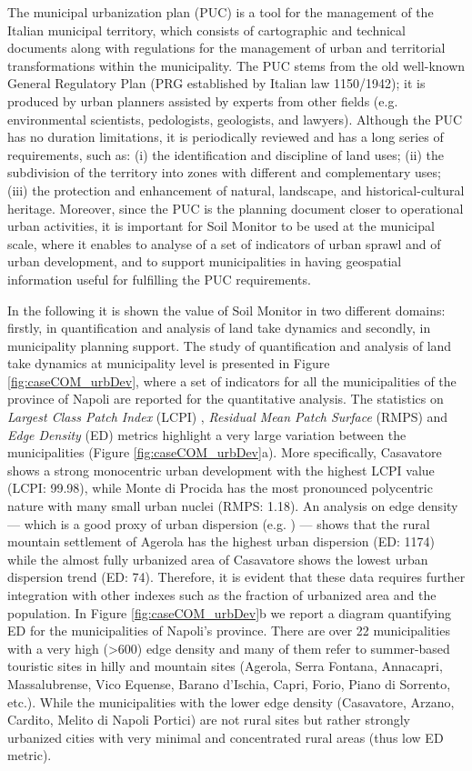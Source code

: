 \documentclass[APA,LATO1COL,doublespace]{WileyNJD-v2}
\begin{document}
The municipal urbanization plan (PUC) is a tool for the management of the Italian municipal territory, which consists of cartographic and technical documents along with regulations for the management of urban and territorial transformations within the municipality.
The PUC stems from the old well-known General Regulatory Plan (PRG established by Italian law 1150/1942); it is produced by urban planners assisted by experts from other fields (e.g. environmental scientists, pedologists, geologists, and lawyers).
Although the PUC has no duration limitations, it is periodically reviewed and has a long series of requirements, such as: (i) the identification and discipline of land uses; (ii) the subdivision of the territory into zones with different and complementary uses; (iii) the protection and enhancement of natural, landscape, and historical-cultural heritage. 
Moreover, since the PUC is the planning document closer to operational urban activities, it is important for Soil Monitor to be used at the municipal scale, where it enables to analyse of a set of indicators of urban sprawl and of urban development, and to support municipalities in having geospatial information useful for fulfilling the PUC requirements.

In the following it is shown the value of Soil Monitor in two different domains: firstly, in quantification and analysis of land take dynamics and secondly, in municipality planning support. 
The study of quantification and analysis of land take dynamics at municipality level is presented in Figure \ref{fig:caseCOM_urbDev}, where a set of indicators for all the municipalities of the province of Napoli are reported for the quantitative analysis.
The statistics on \textit{Largest Class Patch Index} (LCPI) , \textit{Residual Mean Patch Surface} (RMPS) and \textit{Edge Density} (ED) metrics highlight a very large variation between the municipalities (Figure \ref{fig:caseCOM_urbDev}a).
More specifically, Casavatore shows a strong monocentric urban development with the highest LCPI value (LCPI: 99.98), while Monte di Procida has the most pronounced
polycentric nature with many small urban nuclei (RMPS: 1.18).
An analysis on edge density --- which is a good proxy of urban dispersion (e.g. \citealp{SCHWARZ2010}) --- shows that the rural mountain settlement of Agerola has the highest urban dispersion (ED: 1174) while the almost fully urbanized area of Casavatore shows the lowest urban dispersion trend (ED: 74).
Therefore, it is evident that these data requires further integration with other indexes such as the fraction of urbanized area and the population.
In Figure \ref{fig:caseCOM_urbDev}b we report a diagram quantifying ED for the municipalities of Napoli's province.
There are over 22 municipalities with a very high (>600) edge density and many of them refer to summer-based touristic sites in hilly and mountain sites (Agerola, Serra Fontana, Annacapri, Massalubrense, Vico Equense, Barano d'Ischia, Capri, Forio, Piano di Sorrento, etc.).
While the municipalities with the lower edge density (Casavatore, Arzano, Cardito, Melito di Napoli Portici) are not rural sites but rather strongly urbanized cities with very minimal and concentrated rural areas (thus low ED metric).
\end{document}
